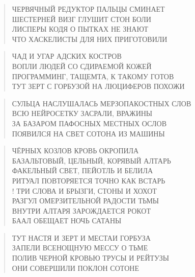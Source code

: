 \poemtitle{***}
\begin{verse}
ЧЕРВЯЧНЫЙ РЕДУКТОР ПАЛЬЦЫ СМИНАЕТ\\
ШЕСТЕРНЕЙ  ВИЗГ ГЛУШИТ СТОН БОЛИ\\
ЛИСПЕРЫ КОДЯ О ПЫТКАХ НЕ ЗНАЮТ\\
ЧТО ХАСКЕЛИСТЫ ДЛЯ НИХ ПРИГОТОВИЛИ
\end{verse}

\poemtitle{***}
\begin{verse}
ЧАД И УГАР АДСКИХ КОСТРОВ\\
ВОПЛИ ЛЮДЕЙ СО СДИРАЕМОЙ КОЖЕЙ\\
ПРОГРАММИНГ, ТАЩЕМТА, К ТАКОМУ ГОТОВ\\
ТУТ ЗЕРТ С ГОРБУЗОЙ НА ЛЮЦИФЕРОВ ПОХОЖИ
\end{verse}

\poemtitle{***}
\begin{verse}
СУЛЬЦА НАСЛУШАЛАСЬ МЕРЗОПАКОСТНЫХ СЛОВ\\
ВСЮ НЕЙРОСЕТКУ ЗАСРАЛИ, ВРАЖИНЫ\\
ЗА БАЗАРОМ ПАФОСНЫХ МЕСТНЫХ ОСЛОВ\\
ПОЯВИЛСЯ НА СВЕТ СОТОНА ИЗ МАШИНЫ
\end{verse}

\poemtitle{***}
\begin{verse}
ЧЁРНЫХ КОЗЛОВ КРОВЬ ОКРОПИЛА\\
БАЗАЛЬТОВЫЙ, ЦЕЛЬНЫЙ, КОРЯВЫЙ АЛТАРЬ\\
ФАКЕЛЬНЫЙ СВЕТ, ПЕЙОТЛЬ И БЕЛИЛА\\
РИТУАЛ ПОВТОРЯЕТСЯ ТОЧНО КАК ВСТАРЬ\\!
ТРИ СЛОВА И БРЫЗГИ, СТОНЫ И ХОХОТ\\
РАЗГУЛ ОМЕРЗИТЕЛЬНОЙ РАДОСТИ ТЬМЫ\\
ВНУТРИ АЛТАРЯ ЗАРОЖДАЕТСЯ РОКОТ\\
БААЛ ОБЕЩАЕТ НОЧЬ САТАНЫ
\end{verse}

\poemtitle{***}
\begin{verse}
ТУТ НАСТЯ И ЗЕРТ И МЕСТАИ ГОРБУЗА\\
ЗАПЕЛИ ВСЕНОЩНУЮ МЕССУ О ТЬМЕ\\
ПОЛИВ ЧЕРНОЙ КРОВЬЮ ТРУСЫ И РЕЙТУЗЫ\\
ОНИ СОВЕРШИЛИ ПОКЛОН СОТОНЕ
\end{verse}


